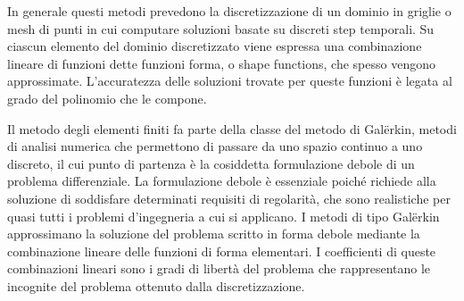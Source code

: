 In generale questi metodi prevedono la discretizzazione di un dominio in griglie o mesh di punti in cui computare soluzioni basate su discreti step temporali.
Su ciascun elemento del dominio discretizzato viene espressa una combinazione lineare di funzioni dette funzioni forma, o shape functions, che spesso vengono approssimate.
L'accuratezza delle soluzioni trovate per queste funzioni è legata al grado del polinomio che le compone.

Il metodo degli elementi finiti fa parte della classe del metodo di Galërkin, metodi di analisi numerica che permettono di passare da uno spazio continuo a uno discreto, il cui punto di partenza
è la cosiddetta formulazione debole di un problema differenziale. La formulazione debole è essenziale poiché richiede alla soluzione di soddisfare determinati requisiti di regolarità,
che sono realistiche per quasi tutti i problemi d'ingegneria a cui si applicano. I metodi di tipo Galërkin approssimano la soluzione del problema scritto in forma debole mediante
la combinazione lineare delle funzioni di forma elementari. I coefficienti di queste combinazioni lineari sono i gradi di libertà del problema che rappresentano le incognite del problema ottenuto dalla discretizzazione.

